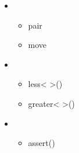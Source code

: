 \documentclass[letterpaper,10pt,english]{sphinxmanual}
\begin{document}
\begin{itemize}
\item {} 
\begin{itemize}
\item {} 
pair

\item {} 
move

\end{itemize}

\item {} 
\begin{itemize}
\item {} 
less\textless{}  \textgreater{}()

\item {} 
greater\textless{}  \textgreater{}()

\end{itemize}

\item {} 
\begin{itemize}
\item {} 
assert()

\end{itemize}

\end{itemize}
\end{document}
